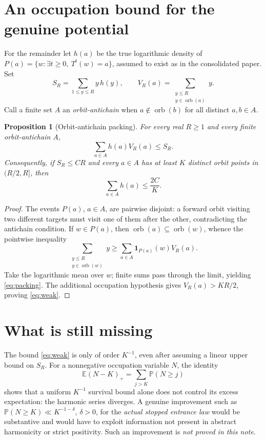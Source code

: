 \documentclass[11pt,a4paper]{article}
\newtheorem{proposition}[theorem]{Proposition}
\newcommand{\ind}{\mathbf 1}
\begin{document}
\section{An occupation bound for the genuine potential}
For the remainder let $h(a)$ be the true logarithmic density of
$P(a)=\{w:\exists t\ge0,\ T^t(w)=a\}$, assumed to exist as in the
consolidated paper. Set
\[
 S_R=\sum_{1\le y\le R}y\,h(y),\qquad
 V_R(a)=\sum_{\substack{y\le R\\ y\in\operatorname{orb}(a)}}y.
\]
Call a finite set $A$ an \emph{orbit-antichain} when
$a\notin\operatorname{orb}(b)$ for all distinct $a,b\in A$.
\begin{proposition}[Orbit-antichain packing]\label{prop:packing}
For every real $R\ge1$ and every finite orbit-antichain $A$,
\begin{equation}\label{eq:packing}
 \boxed{\sum_{a\in A}h(a)V_R(a)\le S_R.}
\end{equation}
Consequently, if $S_R\le CR$ and every $a\in A$ has at least
$K$ \emph{distinct} orbit points in $(R/2,R]$, then
\begin{equation}\label{eq:weak}
 \boxed{\sum_{a\in A}h(a)\le\frac{2C}{K}.}
\end{equation}
\end{proposition}
\begin{proof}
The events $P(a)$, $a\in A$, are pairwise disjoint: a forward orbit
visiting two different targets must visit one of them after the other,
contradicting the antichain condition. If $w\in P(a)$, then
$\operatorname{orb}(a)\subseteq\operatorname{orb}(w)$, whence the
pointwise inequality
\[
 \sum_{\substack{y\le R\\y\in\operatorname{orb}(w)}}y
 \ge\sum_{a\in A}\ind_{P(a)}(w)V_R(a).
\]
Take the logarithmic mean over $w$; finite sums pass through the
limit, yielding \eqref{eq:packing}. The additional occupation
hypothesis gives $V_R(a)>KR/2$, proving \eqref{eq:weak}.
\end{proof}

\section{What is still missing}
The bound \eqref{eq:weak} is only of order $K^{-1}$, even after
assuming a linear upper bound on $S_R$. For a nonnegative occupation
variable $N$, the identity
\[
 \mathbb E(N-K)_+=\sum_{j>K}\mathbb P(N\ge j)
\]
shows that a uniform $K^{-1}$ survival bound alone does not control
its excess expectation: the harmonic series diverges. A genuine
improvement such as $\mathbb P(N\ge K)\ll K^{-1-\delta}$,
$\delta>0$, for the \emph{actual stopped entrance law} would be
substantive and would have to exploit information not present in
abstract harmonicity or strict positivity. Such an improvement is
\emph{not proved in this note}.
\end{document}
